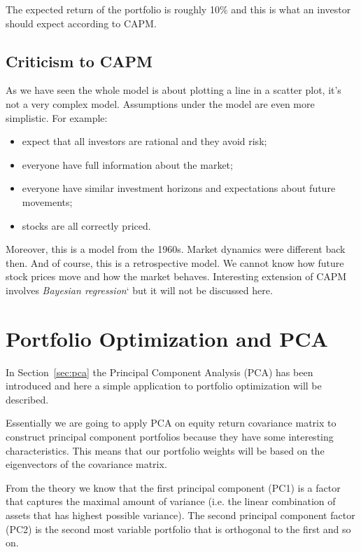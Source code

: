 The expected return of the portfolio is roughly 10\% and this is what an investor should expect according to CAPM.

\subsection{Criticism to CAPM}
As we have seen the whole model is about plotting a line in a scatter plot, it’s not a very complex model. Assumptions under the model are even more simplistic. For example:
\begin{itemize}
\tightlist
\item expect that all investors are rational and they avoid risk;
\item everyone have full information about the market;
\item everyone have similar investment horizons and expectations about future movements;
\item stocks are all correctly priced.
\end{itemize}

Moreover, this is a model from the 1960s. Market dynamics were different back then. And of course, this is a retrospective model. We cannot know how future stock prices move and how the market behaves.
Interesting extension of CAPM involves \emph{Bayesian regression}`\cite{bib:baysean_regression} but it will not be discussed here.

\section{Portfolio Optimization and PCA}
\label{portfolio-optimization-and-pca}

In Section~\ref{sec:pca} the Principal Component Analysis (PCA)
has been introduced and here a simple application to portfolio
optimization will be described.

Essentially we are going to apply PCA on equity return covariance matrix
to construct principal component portfolios because they have some
interesting characteristics. This means that our portfolio weights will be
based on the eigenvectors of the covariance matrix.

From the theory we know that the first principal component (PC1) is a
factor that captures the maximal amount of variance (i.e. the linear
combination of assets that has highest possible variance). The second
principal component factor (PC2) is the second most variable portfolio
that is orthogonal to the first and so on.

